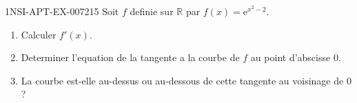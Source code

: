 \begin{exercice}{1NSI-APT-EX-007}{2}{15}
Soit $f$ definie sur $\mathbb{R}$ par $f(x) = \mathrm{e}^{x^2 - 2}$.
\begin{enumerate}
  \item Calculer $f'(x)$.
  \item Determiner l'equation de la tangente a la courbe de $f$ au point d'abscisse $0$.
  \item La courbe est-elle au-dessus ou au-dessous de cette tangente au voisinage de $0$ ?
\end{enumerate}

\end{exercice}
